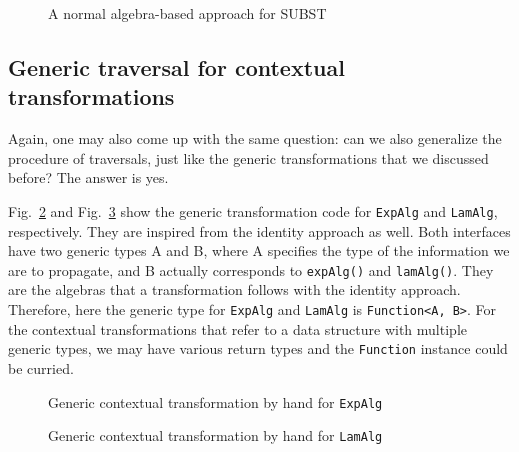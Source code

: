 \begin{figure}[tb]
\vspace{-.1in}
\caption{A normal algebra-based approach for SUBST}
\label{capture_avoid_without_id}
\end{figure}

\subsection{Generic traversal for contextual transformations}\label{subsec:genericcontexttrans}

Again, one may also come up with the same question: can we also generalize the procedure of traversals, just like the generic transformations that we discussed before? The answer is yes.

Fig.~\ref{context_trans_expalg} and Fig.~\ref{context_trans_lamalg} show the generic transformation code for \lstinline{ExpAlg} and \lstinline{LamAlg}, respectively. They are inspired from the identity approach as well. Both interfaces have two generic types A and B, where A specifies the type of the information we are to propagate, and B actually corresponds to \lstinline{expAlg()} and \lstinline{lamAlg()}. They are the algebras that a transformation follows with the identity approach. Therefore, here the generic type for \lstinline{ExpAlg} and \lstinline{LamAlg} is \lstinline{Function<A, B>}. For the contextual transformations that refer to a data structure with multiple generic types, we may have various return types and the \lstinline{Function} instance could be curried.

\begin{figure}[tb]
\vspace{-.1in}
\caption{Generic contextual transformation by hand for \lstinline{ExpAlg}}
\label{context_trans_expalg}
\end{figure}

\begin{figure}[tb]
\vspace{-.1in}
\caption{Generic contextual transformation by hand for \lstinline{LamAlg}}
\label{context_trans_lamalg}
\end{figure}

